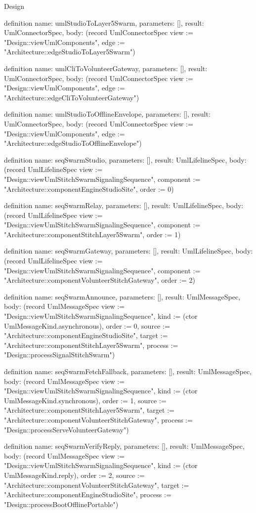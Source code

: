 \begin{lexlean}{Design}
\begin{semanticmodule}
definition{
  name: umlStudioToLayer5Swarm,
  parameters: [],
  result: UmlConnectorSpec,
  body: (record UmlConnectorSpec {view := "Design::viewUmlComponents", edge := "Architecture::edgeStudioToLayer5Swarm"})
}

definition{
  name: umlCliToVolunteerGateway,
  parameters: [],
  result: UmlConnectorSpec,
  body: (record UmlConnectorSpec {view := "Design::viewUmlComponents", edge := "Architecture::edgeCliToVolunteerGateway"})
}

definition{
  name: umlStudioToOfflineEnvelope,
  parameters: [],
  result: UmlConnectorSpec,
  body: (record UmlConnectorSpec {view := "Design::viewUmlComponents", edge := "Architecture::edgeStudioToOfflineEnvelope"})
}

definition{
  name: seqSwarmStudio,
  parameters: [],
  result: UmlLifelineSpec,
  body: (record UmlLifelineSpec {view := "Design::viewUmlStitchSwarmSignalingSequence", component := "Architecture::componentEngineStudioSite", order := 0})
}

definition{
  name: seqSwarmRelay,
  parameters: [],
  result: UmlLifelineSpec,
  body: (record UmlLifelineSpec {view := "Design::viewUmlStitchSwarmSignalingSequence", component := "Architecture::componentStitchLayer5Swarm", order := 1})
}

definition{
  name: seqSwarmGateway,
  parameters: [],
  result: UmlLifelineSpec,
  body: (record UmlLifelineSpec {view := "Design::viewUmlStitchSwarmSignalingSequence", component := "Architecture::componentVolunteerStitchGateway", order := 2})
}

definition{
  name: seqSwarmAnnounce,
  parameters: [],
  result: UmlMessageSpec,
  body: (record UmlMessageSpec {view := "Design::viewUmlStitchSwarmSignalingSequence", kind := (ctor UmlMessageKind.asynchronous), order := 0, source := "Architecture::componentEngineStudioSite", target := "Architecture::componentStitchLayer5Swarm", process := "Design::processSignalStitchSwarm"})
}

definition{
  name: seqSwarmFetchFallback,
  parameters: [],
  result: UmlMessageSpec,
  body: (record UmlMessageSpec {view := "Design::viewUmlStitchSwarmSignalingSequence", kind := (ctor UmlMessageKind.synchronous), order := 1, source := "Architecture::componentStitchLayer5Swarm", target := "Architecture::componentVolunteerStitchGateway", process := "Design::processServeVolunteerGateway"})
}

definition{
  name: seqSwarmVerifyReply,
  parameters: [],
  result: UmlMessageSpec,
  body: (record UmlMessageSpec {view := "Design::viewUmlStitchSwarmSignalingSequence", kind := (ctor UmlMessageKind.reply), order := 2, source := "Architecture::componentVolunteerStitchGateway", target := "Architecture::componentEngineStudioSite", process := "Design::processBootOfflinePortable"})
}


\end{semanticmodule}
\end{lexlean}
